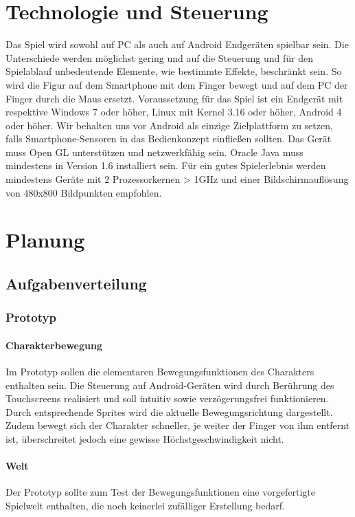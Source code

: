 \documentclass[10pt,a4paper,notitlepage]{report}
\begin{document}
\begin{flushleft}
\chapter{Technologie und Steuerung}
Das Spiel wird sowohl auf PC als auch auf Android Endgeräten spielbar sein. Die Unterschiede werden möglichst gering und auf die Steuerung und für den Spielablauf unbedeutende Elemente, wie bestimmte Effekte, beschränkt sein. So wird die Figur auf dem Smartphone mit dem Finger bewegt und auf dem PC der Finger durch die Maus ersetzt.
Voraussetzung für das Spiel ist ein Endgerät mit respektive Windows 7 oder höher, Linux mit Kernel 3.16 oder höher, Android 4 oder höher. Wir behalten uns vor Android als einzige Zielplattform zu setzen, falls Smartphone-Sensoren in das Bedienkonzept einfließen sollten. Das Gerät muss Open GL unterstützen und netzwerkfähig sein. Oracle Java muss mindestens in Version 1.6 installiert sein. Für ein gutes Spielerlebnis werden mindestens Geräte mit 2 Prozessorkernen > 1GHz und einer Bildschirmauflösung von 480x800 Bildpunkten empfohlen.

\chapter{Planung}
\section{Aufgabenverteilung}
\subsection{Prototyp}

\subsubsection{Charakterbewegung}
Im Prototyp sollen die elementaren Bewegungsfunktionen des Charakters enthalten sein. Die Steuerung auf Android-Geräten wird durch Berührung des Touchscreens realisiert und soll intuitiv sowie verzögerungsfrei funktionieren. Durch entsprechende Sprites wird die aktuelle Bewegungsrichtung dargestellt. Zudem bewegt sich der Charakter schneller, je weiter der Finger von ihm entfernt ist, überschreitet jedoch eine gewisse Höchstgeschwindigkeit nicht.

\subsubsection{Welt}
Der Prototyp sollte zum Test der Bewegungsfunktionen eine vorgefertigte Spielwelt enthalten, die noch keinerlei zufälliger Erstellung bedarf.


\end{flushleft}
\end{document}
